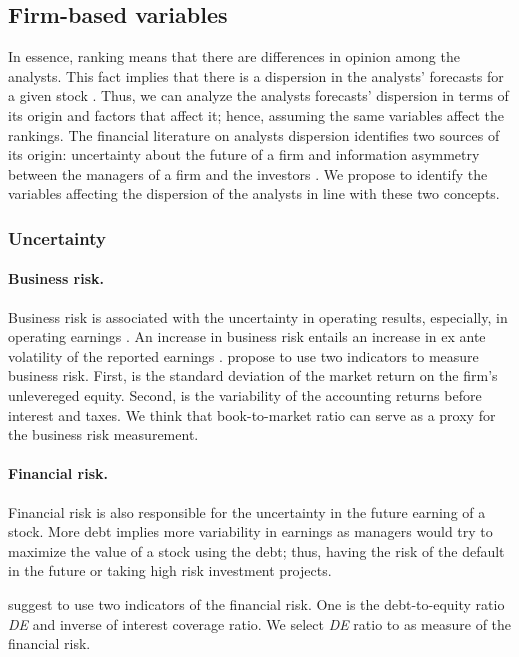 \documentclass{article}\usepackage[]{graphicx}\usepackage[]{color}
\begin{document}
\subsection{Firm-based variables}

In essence, ranking means that there are differences in opinion among the analysts.  This fact implies that there is  a dispersion in the analysts' forecasts for a given stock \citep{diether2002}. Thus, we can analyze  the analysts forecasts' dispersion in terms of its origin and factors that affect it; hence, assuming the same variables affect the rankings.
The financial literature on analysts dispersion identifies two sources of its origin: uncertainty about the future of a firm  and information asymmetry between the managers of a firm and the investors \citep{barron1998,barron2009}. We propose to identify the variables affecting the dispersion of the analysts in line with these two concepts.

\subsubsection{Uncertainty}

\paragraph{Business risk.} Business risk is associated with the uncertainty in operating results, especially, in operating earnings \citep{hill1980}. An increase in business risk entails an increase in ex ante volatility of the reported earnings \citep{parkash1995}. \cite{parkash1995} propose to use two indicators to measure business risk. First, is the standard deviation of the market return on the firm's unlevereged equity. Second, is the variability of the accounting returns before interest and taxes. We think that  book-to-market ratio can serve as a proxy for the business risk measurement. 

\paragraph{Financial risk.} Financial risk is also responsible for the uncertainty in the future earning of a stock. More debt implies more variability in earnings as managers would try to maximize the value of a stock using the debt; thus, having the risk of the default in the future or taking high risk investment projects. 

\cite{parkash1995} suggest to use two indicators of the financial risk. One is the debt-to-equity ratio \emph{DE} and inverse of interest coverage ratio. We select \emph{DE} ratio to as measure of the financial risk.
\end{document}
